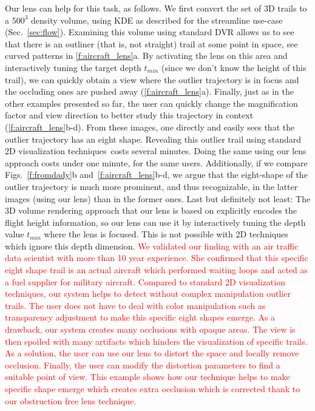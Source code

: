 Our lens can help for this task, as follows. We first convert the set of 3D trails to a $500^3$ density volume, using KDE as described for the streamline use-case (Sec.~\ref{sec:flow}). Examining this volume using standard DVR allows us to see that there is an outliner (that is, not straight) trail at some point in space, see curved patterns in \autoref{f:aircraft_lens}a. By activating the lens on this area and interactively tuning the target depth $t_{min}$ (since we don't know the height of this trail), we can quickly obtain a view where the outlier trajectory is in focus and the occluding ones are pushed away (\autoref{f:aircraft_lens}a). Finally, just as in the other examples presented so far, the user can quickly change the magnification factor and view direction to better study this trajectory in context (\autoref{f:aircraft_lens}b-d). From these images, one directly and easily sees that the outlier trajectory has an eight shape. Revealing this outlier trail using standard 2D visualization techniques\,\cite{hurter2009fromdady} costs several minutes. Doing the same using our lens approach costs under one minute, for the same users. Additionally, if we compare Figs.~\ref{f:fromdady}b and~\ref{f:aircraft_lens}b-d, we argue that the eight-shape of the outlier trajectory is much more prominent, and thus recognizable, in the latter images (using our lens) than in the former ones. Last but definitely not least: The 3D volume rendering approach that our lens is based on explicitly encodes the flight height information, so our lens can use it by interactively tuning the depth value $t_{min}$ where the lens is focused. This is not possible with 2D techniques which ignore this depth dimension.
\textcolor{red}{
We validated our finding with an air traffic data scientist with more than 10 year experience. She confirmed that this specific eight shape trail is an actual aircraft which performed waiting loops and acted as a fuel supplier for military aircraft.
Compared to standard 2D visualization techniques, our system helps to detect without complex manipulation outlier trails. The user does not have to deal with color manipulation such as transparency adjustment to make this specific eight shapes emerge. As a drawback, our system creates many occlusions with opaque areas. The view is then spoiled with many artifacts which hinders the visualization of specific trails. As a solution, the user can use our lens to distort the space and locally remove occlusion. Finally, the user can modify the distortion parameters to find a suitable point of view. This example shows how our technique helps to make specific shape emerge which creates extra occlusion which is corrected thank to our obstruction free lens technique.}

